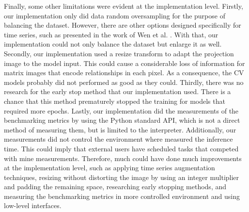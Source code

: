 Finally, some other limitations were evident at the implementation level. Firstly, our implementation only did data random oversampling for the purpose of balancing the dataset. However, there are other options designed specifically for time series, such as presented in the work of Wen et al. \cite{TimeSeriesAugmentation}. With that, our implementation could not only balance the dataset but enlarge it as well. Secondly, our implementation used a resize transform to adapt the projection image to the model input. This could cause a considerable loss of information for matrix images that encode relationships in each pixel. As a consequence, the \gls{CV} models probably did not performed as good as they could. Thirdly, there was no research for the early stop method that our implementation used. There is a chance that this method prematurely stopped the training for models that required more epochs. Lastly, our implementation did the measurements of the benchmarking metrics by using the Python standard API, which is not a direct method of measuring them, but is limited to the interpreter. Additionally, our measurements did not control the environment where measured the inference time. This could imply that external users have scheduled tasks that competed with mine measurements. Therefore, much could have done much improvements at the implementation level, such as applying time series augmentation techniques, resizing without distorting the image by using an integer multiplier and padding the remaining space, researching early stopping methods, and measuring the benchmarking metrics in more controlled environment and using low-level interfaces.        
